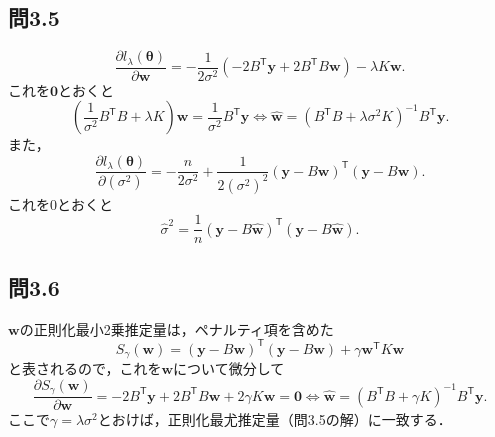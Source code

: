 \documentclass[pdflatex,ja=standard]{bxjsarticle}
\begin{document}
\subsection*{問3.5}
\begin{equation}
\frac{\partial l_{\lambda} (\bm{\theta}) }{\partial \bm{w}} = - \frac{1}{2 \sigma^2} ( -2 B^{\mathsf{T}} \bm{y} + 2 B^{\mathsf{T}} B \bm{w}) - \lambda K \bm{w}.
\end{equation}
これを$\bm{0}$とおくと
\begin{equation}
\left( \frac{1}{\sigma^2} B^{\mathsf{T}} B + \lambda K \right) \bm{w} = \frac{1}{\sigma^2} B^{\mathsf{T}} \bm{y}
\iff \hat{\bm{w}} = \left(B^{\mathsf{T}} B + \lambda \sigma^2  K \right)^{-1} B^{\mathsf{T}} \bm{y}.
\end{equation}
また，
\begin{equation}
\frac{\partial l_{\lambda} (\bm{\theta}) }{\partial (\sigma^2)} = - \frac{n}{2 \sigma^2} + \frac{1}{2 (\sigma^2)^2} (\bm{y} - B \bm{w})^{\mathsf{T}} (\bm{y} - B \bm{w}).
\end{equation}
これを0とおくと
\begin{equation}
\hat{\sigma}^2 = \frac{1}{n} (\bm{y} - B \hat{\bm{w}})^{\mathsf{T}} (\bm{y} - B \hat{\bm{w}}).
\end{equation}

\subsection*{問3.6}
$\bm{w}$の正則化最小2乗推定量は，ペナルティ項を含めた
\begin{equation}
S_{\gamma} (\bm{w}) = (\bm{y} - B \bm{w})^{\mathsf{T}} (\bm{y} - B \bm{w}) + \gamma \bm{w}^{\mathsf{T}} K \bm{w}
\end{equation}
と表されるので，これを$\bm{w}$について微分して
\begin{equation}
\frac{\partial S_{\gamma} (\bm{w}) }{\partial \bm{w}} = -2 B^{\mathsf{T}} \bm{y} + 2 B^{\mathsf{T}} B \bm{w} + 2 \gamma K \bm{w} = \bm{0}
\iff \hat{\bm{w}} = (B^{\mathsf{T}} B + \gamma K)^{-1} B^{\mathsf{T}} \bm{y}.
\end{equation}
ここで$\gamma = \lambda \sigma^2$とおけば，正則化最尤推定量（問3.5の解）に一致する．
\end{document}
